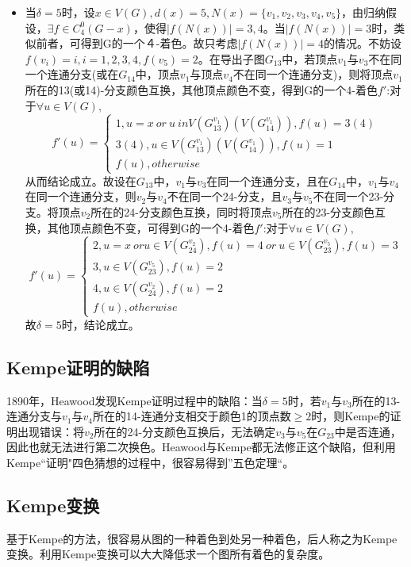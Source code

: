 \documentclass[12pt, UTF8]{ctexart}
\begin{document}
\begin{itemize}
\item 当$\delta=5$时，设$x \in V(G), d(x) = 5, N(x) = \{v_1, v_2, v_3, v_4, v_5\}$，由归纳假设，$\exists f \in C^0_4(G-x)$，使得$|f(N(x))|=3,4$。当$|f(N(x))|=3$时，类似前者，可得到G的一个４-着色。故只考虑$|f(N(x))|=4$的情况。不妨设$f(v_i)=i, i=1,2,3,4, f(v_5)=2$。在导出子图$G_{13}$中，若顶点$v_1$与$v_3$不在同一个连通分支(或在$G_{14}$中，顶点$v_1$与顶点$v_4$不在同一个连通分支)，则将顶点$v_1$所在的13(或14)-分支颜色互换，其他顶点颜色不变，得到G的一个4-着色$f'$:对于$\forall u \in V(G),$
\[
    f'(u) = \begin{cases}
        1, u = x\ or\ u \ in V(G_{13}^{v_1})(V(G_{14}^{v_1})), f(u) = 3(4)\\
        3(4), u \in V(G_{13}^{v_1})(V(G_{14}^{v_1})), f(u) = 1\\
        f(u), otherwise
    \end{cases}
\]
从而结论成立。故设在$G_{13}$中，$v_1$与$v_3$在同一个连通分支，且在$G_{14}$中，$v_1$与$v_4$在同一个连通分支，则$v_2$与$v_4$不在同一个24-分支，且$v_3$与$v_5$不在同一个23-分支。将顶点$v_2$所在的24-分支颜色互换，同时将顶点$v_5$所在的23-分支颜色互换，其他顶点颜色不变，可得到G的一个4-着色$f'$:对于$\forall u \in V(G),$
\[
    f'(u) = \begin{cases}
        2, u = x\ or u \in V(G_{24}^{v_2}),f(u)=4\ or\ u \in V(G_{23}^{v_5}),f(u)=3\\
        3, u \in V(G_{23}^{v_5}), f(u) = 2\\
        4, u \in V(G_{24}^{v_2}), f(u) = 2\\
        f(u), otherwise
    \end{cases}
\]
故$\delta = 5$时，结论成立。
\end{itemize}

\subsection{Kempe证明的缺陷}
1890年，Heawood发现Kempe证明过程中的缺陷：当$\delta = 5$时，若$v_1$与$v_3$所在的13-连通分支与$v_1$与$v_4$所在的14-连通分支相交于颜色1的顶点数$\ge 2$时，则Kempe的证明出现错误：将$v_2$所在的24-分支颜色互换后，无法确定$v_3$与$v_5$在$G_{23}$中是否连通，因此也就无法进行第二次换色。Heawood与Kempe都无法修正这个缺陷，但利用Kempe“证明"四色猜想的过程中，很容易得到”五色定理“。

\subsection{Kempe变换}
基于Kempe的方法，很容易从图的一种着色到处另一种着色，后人称之为Kempe变换。利用Kempe变换可以大大降低求一个图所有着色的复杂度。
\end{document}
